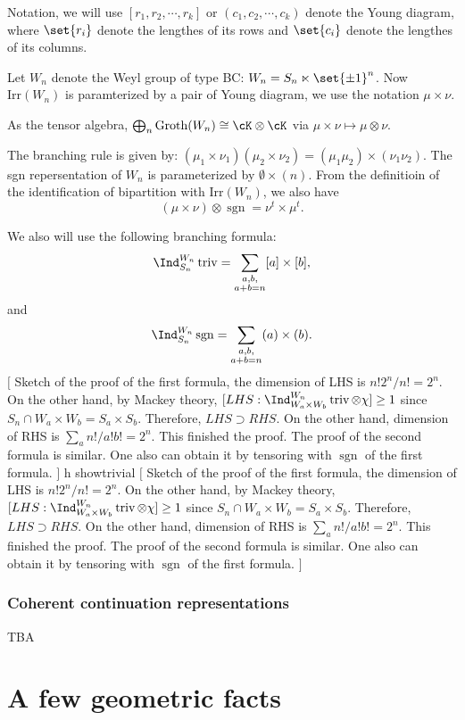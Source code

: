 \documentclass[12pt,a4paper]{amsart}
\newcommand{\trivial}[2][]{\if\relax\detokenize{#1}\relax
  {%
      \color{orange} \vspace{0em} $[$  #2 $]$
      \color{black}
  }
  \else
\ifx#1h
\ifcsname showtrivial\endcsname
{%
    \color{orange} \vspace{0em}  $[$ #2 $]$
    \color{black}
}
\fi
\else {\red Wrong argument!} \fi
\fi
}
\newcommand{\sgn}{\operatorname{sgn}}
\newcommand{\triv}{\operatorname{triv}}
\numberwithin{equation}{section}
\theoremstyle{remark}
\def\Groth{\mathrm{Groth}}
\def\Irr{\mathrm{Irr}}
\begin{document}
Notation, we will use $[r_1, r_2, \cdots, r_k]$ or $(c_1,c_2, \cdots, c_k)$
denote the Young diagram, where $\set{r_i}$ denote the lengthes of its rows and
$\set{c_i}$ denote the lengthes of its columns.

Let $W_n$ denote the Weyl group of type BC: $W_n = S_n \ltimes \set{\pm 1}^n$.
Now $\Irr(W_n)$ is paramterized by a pair of Young diagram, we use the notation
$\mu\times \nu$.

As the tensor algebra, $\bigoplus_n \Groth(W_n)\cong \cK\otimes \cK$ via
$\mu\times \nu \mapsto \mu \otimes \nu$.

The branching rule is given by:
$(\mu_1\times \nu_1)(\mu_2\times \nu_2) = (\mu_1\mu_2)\times (\nu_1 \nu_2)$.
The sgn repersentation of $W_n$ is parameterized by $\emptyset\times (n)$.  From
the definitioin of the identification of bipartition with $\Irr(W_n)$, we also
have
\[
  (\mu\times \nu) \otimes \sgn = \nu^t\times \mu^t.
\]

We also will use the following branching formula:
\[
  \Ind_{S_n}^{W_n} \triv = \sum_{\substack{a,b,\\ a+b=n}} [a]\times [b],
\]
and
\begin{equation}\label{eq:SW2}
  \Ind_{S_n}^{W_n} \sgn = \sum_{\substack{a,b,\\ a+b=n}}
  (a)\times (b).
\end{equation}
\trivial{ Sketch of the proof of the first formula, the dimension of LHS is
  $n!2^n/n! = 2^n$.  On the other hand, by Mackey theory,
  $[LHS:\Ind_{W_a\times W_b}^{W_n} \triv \otimes \chi ] \geq 1$ since
  $S_n\cap W_a\times W_b = S_a\times S_b$.  Therefore, $LHS\supset RHS$.  On the
  other hand, dimension of RHS is $\sum_{a} n!/a!b! = 2^n$.  This finished the
  proof.  The proof of the second formula is similar. One also can obtain it by
  tensoring with $\sgn$ of the first formula.  }

\subsubsection{Coherent continuation representations}

{\color{red} TBA}


\section{A few geometric facts}
\def\dbM{\breve{M}}
\def\dbMM{\breve{MM}}
\def\dbX{\breve{X}}
\def\dbfpp{\breve{\fpp}}
\def\ZdbX{\cZ_{\dbX}}
\def\aV{\acute{V}}
\end{document}
